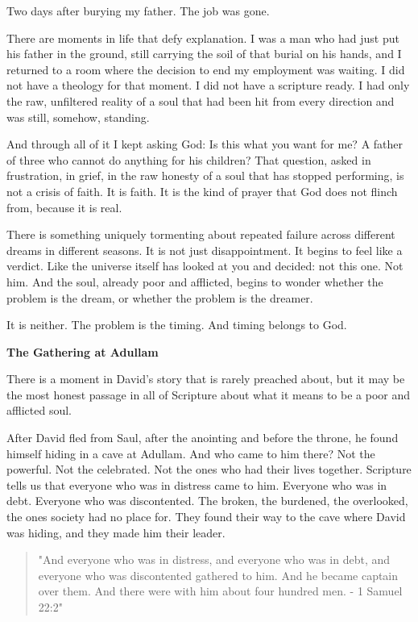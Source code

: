 Two days after burying my father. The job was gone.

There are moments in life that defy explanation. I was a man who had
just put his father in the ground, still carrying the soil of that
burial on his hands, and I returned to a room where the decision to end
my employment was waiting. I did not have a theology for that moment. I
did not have a scripture ready. I had only the raw, unfiltered reality
of a soul that had been hit from every direction and was still, somehow,
standing.

And through all of it I kept asking God: Is this what you want for me? A
father of three who cannot do anything for his children? That question,
asked in frustration, in grief, in the raw honesty of a soul that has
stopped performing, is not a crisis of faith. It is faith. It is the
kind of prayer that God does not flinch from, because it is real.

There is something uniquely tormenting about repeated failure across
different dreams in different seasons. It is not just disappointment. It
begins to feel like a verdict. Like the universe itself has looked at
you and decided: not this one. Not him. And the soul, already poor and
afflicted, begins to wonder whether the problem is the dream, or whether
the problem is the dreamer.

It is neither. The problem is the timing. And timing belongs to God.

\textbf{The Gathering at Adullam}

There is a moment in David's story that is rarely preached about, but it
may be the most honest passage in all of Scripture about what it means
to be a poor and afflicted soul.

After David fled from Saul, after the anointing and before the throne,
he found himself hiding in a cave at Adullam. And who came to him there?
Not the powerful. Not the celebrated. Not the ones who had their lives
together. Scripture tells us that everyone who was in distress came to
him. Everyone who was in debt. Everyone who was discontented. The
broken, the burdened, the overlooked, the ones society had no place for.
They found their way to the cave where David was hiding, and they made
him their leader.

\begin{quote}
"And everyone who was in distress, and everyone who was in debt, and
everyone who was discontented gathered to him. And he became captain
over them. And there were with him about four hundred men. - 1 Samuel
22:2"
\end{quote}

